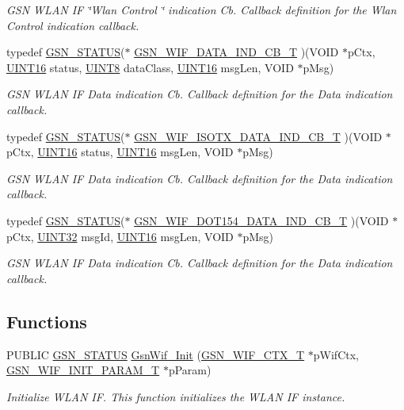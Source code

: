 \begin{DoxyCompactItemize}
\begin{DoxyCompactList}\small\item\em GSN WLAN IF \char`\"{}Wlan Control \char`\"{} indication Cb. Callback definition for the Wlan Control indication callback. \end{DoxyCompactList}\item 
typedef \hyperlink{a00660_gada5951904ac6110b1fa95e51a9ddc217}{GSN\_\-STATUS}($\ast$ \hyperlink{a00635_gad46de129691b078bd6ff8df7f46318d2}{GSN\_\-WIF\_\-DATA\_\-IND\_\-CB\_\-T} )(VOID $\ast$pCtx, \hyperlink{a00660_ga09f1a1fb2293e33483cc8d44aefb1eb1}{UINT16} status, \hyperlink{a00660_gab27e9918b538ce9d8ca692479b375b6a}{UINT8} dataClass, \hyperlink{a00660_ga09f1a1fb2293e33483cc8d44aefb1eb1}{UINT16} msgLen, VOID $\ast$pMsg)
\begin{DoxyCompactList}\small\item\em GSN WLAN IF Data indication Cb. Callback definition for the Data indication callback. \end{DoxyCompactList}\item 
typedef \hyperlink{a00660_gada5951904ac6110b1fa95e51a9ddc217}{GSN\_\-STATUS}($\ast$ \hyperlink{a00635_ga9630fce1058035404e218cc275052c03}{GSN\_\-WIF\_\-ISOTX\_\-DATA\_\-IND\_\-CB\_\-T} )(VOID $\ast$pCtx, \hyperlink{a00660_ga09f1a1fb2293e33483cc8d44aefb1eb1}{UINT16} status, \hyperlink{a00660_ga09f1a1fb2293e33483cc8d44aefb1eb1}{UINT16} msgLen, VOID $\ast$pMsg)
\begin{DoxyCompactList}\small\item\em GSN WLAN IF Data indication Cb. Callback definition for the Data indication callback. \end{DoxyCompactList}\item 
typedef \hyperlink{a00660_gada5951904ac6110b1fa95e51a9ddc217}{GSN\_\-STATUS}($\ast$ \hyperlink{a00635_gaeb1ca28d0827d970df3911f1bd46cf98}{GSN\_\-WIF\_\-DOT154\_\-DATA\_\-IND\_\-CB\_\-T} )(VOID $\ast$pCtx, \hyperlink{a00660_gae1e6edbbc26d6fbc71a90190d0266018}{UINT32} msgId, \hyperlink{a00660_ga09f1a1fb2293e33483cc8d44aefb1eb1}{UINT16} msgLen, VOID $\ast$pMsg)
\begin{DoxyCompactList}\small\item\em GSN WLAN IF Data indication Cb. Callback definition for the Data indication callback. \end{DoxyCompactList}\end{DoxyCompactItemize}
\subsection*{Functions}
\begin{DoxyCompactItemize}
\item 
PUBLIC \hyperlink{a00660_gada5951904ac6110b1fa95e51a9ddc217}{GSN\_\-STATUS} \hyperlink{a00635_ga1ffa97473da0d308f2f3d214c775c8da}{GsnWif\_\-Init} (\hyperlink{a00323}{GSN\_\-WIF\_\-CTX\_\-T} $\ast$pWifCtx, \hyperlink{a00338}{GSN\_\-WIF\_\-INIT\_\-PARAM\_\-T} $\ast$pParam)
\begin{DoxyCompactList}\small\item\em Initialize WLAN IF. This function initializes the WLAN IF instance. \end{DoxyCompactList}\end{DoxyCompactItemize}


